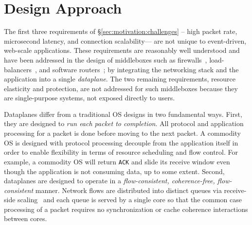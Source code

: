 \section{\ix Design Approach}
\label{sec:design}


The first three requirements of \S\ref{sec:motivation:challenges} --
high packet rate, microsecond latency, and connection scalability---
are not unique to event-driven, web-scale applications.  These
requirements are reasonably well understood and have been addressed in
the design of middleboxes such as firewalls~\cite{missing},
load-balancers~\cite{missing}, and software
routers~\cite{DBLP:journals/tocs/KohlerMCJK00,DBLP:conf/sosp/DobrescuEACFIKMR09};
by integrating the networking stack and the application into a single
\emph{dataplane}. The two remaining requirements, resource elasticity
and protection, are not addressed for such middleboxes because they
are single-purpose systems, not exposed directly to users. 


Dataplanes differ from a traditional OS designs in two fundamental
ways. First, they are designed to \emph{run each packet to
  completion}. All protocol and application processing for a packet is
done before moving to the next packet.  A commodity OS is designed
with protocol processing decouple from the application itself in order
to enable flexibility in terms of resource scheduling and flow
control. For example, a commodity OS will return \texttt{ACK} and
slide its receive window even though the application is not consuming
data, up to some extent. Second, dataplanes are designed to operate in
a \emph{flow-consistent, coherence-free, flow-consistent} manner.
Network flows are distributed into distinct queues via receive-side 
scaling~\cite{DBLP:journals/computer/RegnierMIIMHNCF04} and each queue is served by a single core so that
the common case processing of a packet requires no
synchronization or cache coherence interactions between cores.

